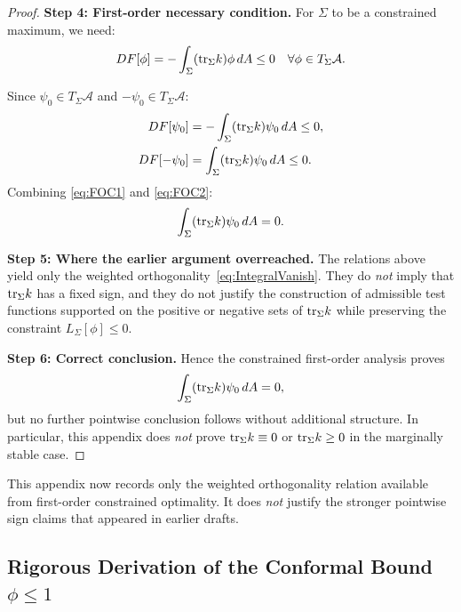 \begin{proof}
\textbf{Step 4: First-order necessary condition.}
For $\Sigma$ to be a constrained maximum, we need:
\begin{equation}\label{eq:FirstOrderNC}
    DF[\phi] = -\int_\Sigma (\mathrm{tr}_\Sigma k) \phi \, dA \le 0 \quad \forall \phi \in T_\Sigma \mathcal{A}.
\end{equation}

Since $\psi_0 \in T_\Sigma \mathcal{A}$ and $-\psi_0 \in T_\Sigma \mathcal{A}$:
\begin{align}
    DF[\psi_0] &= -\int_\Sigma (\mathrm{tr}_\Sigma k) \psi_0 \, dA \le 0, \label{eq:FOC1}\\
    DF[-\psi_0] &= \int_\Sigma (\mathrm{tr}_\Sigma k) \psi_0 \, dA \le 0. \label{eq:FOC2}
\end{align}
Combining \eqref{eq:FOC1} and \eqref{eq:FOC2}:
\begin{equation}\label{eq:IntegralVanish}
    \int_\Sigma (\mathrm{tr}_\Sigma k) \psi_0 \, dA = 0.
\end{equation}

\textbf{Step 5: Where the earlier argument overreached.}
The relations above yield only the weighted orthogonality~\eqref{eq:IntegralVanish}. They do \emph{not} imply that $\mathrm{tr}_\Sigma k$ has a fixed sign, and they do not justify the construction of admissible test functions supported on the positive or negative sets of $\mathrm{tr}_\Sigma k$ while preserving the constraint $L_\Sigma[\phi] \le 0$.

\textbf{Step 6: Correct conclusion.}
Hence the constrained first-order analysis proves
\[
    \int_\Sigma (\mathrm{tr}_\Sigma k)\psi_0\, dA = 0,
\]
but no further pointwise conclusion follows without additional structure. In particular, this appendix does \emph{not} prove $\mathrm{tr}_\Sigma k \equiv 0$ or $\mathrm{tr}_\Sigma k \ge 0$ in the marginally stable case.
\end{proof}

\begin{remark}
This appendix now records only the weighted orthogonality relation available from first-order constrained optimality. It does \emph{not} justify the stronger pointwise sign claims that appeared in earlier drafts.
\end{remark}

\subsection{Rigorous Derivation of the Conformal Bound \texorpdfstring{$\phi \le 1$}{phi <= 1}}\label{app:ConformalDerivation}

